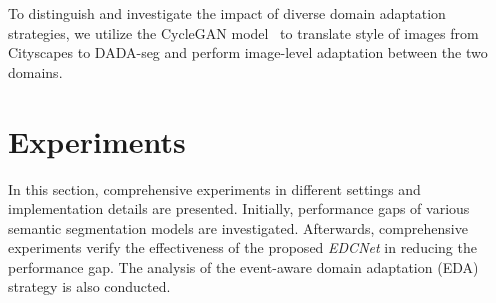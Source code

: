 \documentclass[journal]{IEEEtran}
\begin{document}
To distinguish and {investigate} the impact of diverse domain adaptation strategies, we utilize the CycleGAN model~\cite{zhu2017cycleGAN} to translate style of images from Cityscapes to DADA-seg and perform image-level adaptation between the two domains. 

\section{Experiments}
In this section, comprehensive experiments in different settings and implementation details are presented. Initially, performance gaps of various semantic segmentation models are investigated. Afterwards, comprehensive experiments verify the effectiveness of the proposed \emph{EDCNet} in reducing the performance gap. The analysis of the event-aware domain adaptation (EDA) strategy is also conducted.
\end{document}
